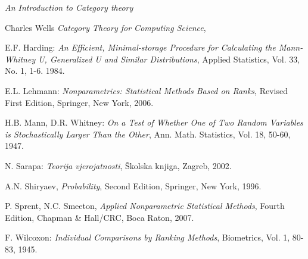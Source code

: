 \documentclass[ a4paper, 12pt]{report}
\theoremstyle{definition}
\numberwithin{Primjer}{chapter}
\renewcommand{\theequation}{\arabic{chapter}.\arabic{section}.\arabic{equation}}
\begin{document}
%
%
\appendix
%
\renewcommand{\theequation}{A.\arabic{equation}}
%
%
\newpage
{}
\begin{thebibliography}{99}



\textit{An Introduction to Category theory}

 Charles Wells
\textit{Category Theory for Computing Science},

 E.F. Harding:
\textit{An Efficient, Minimal-storage Procedure for Calculating
the Mann-Whitney U, Generalized U and Similar Distributions},
Applied Statistics, Vol. 33, No. 1, 1-6. 1984.

 E.L. Lehmann:
\textit{Nonparametrics: Statistical Methods Based on Ranks},
Revised First Edition, Springer, New York, 2006.

 H.B. Mann, D.R. Whitney:
\textit{On a Test of Whether One of Two Random
Variables is Stochastically Larger Than the Other},
Ann. Math. Statistics, Vol. 18, 50-60, 1947.

 N. Sarapa: \textit{Teorija vjerojatnosti},
\v{S}kolska knjiga, Zagreb, 2002.

 A.N. Shiryaev, \textit{Probability},
Second Edition, Springer, New York, 1996.

 P. Sprent, N.C. Smeeton,
\textit{Applied Nonparametric Statistical Methods},
Fourth Edition, Chapman \& Hall/CRC, Boca Raton, 2007.

 F. Wilcoxon:
\textit{Individual Comparisons by Ranking Methods},
Biometrics, Vol. 1, 80-83, 1945.

\end{thebibliography}
%
\end{document}
